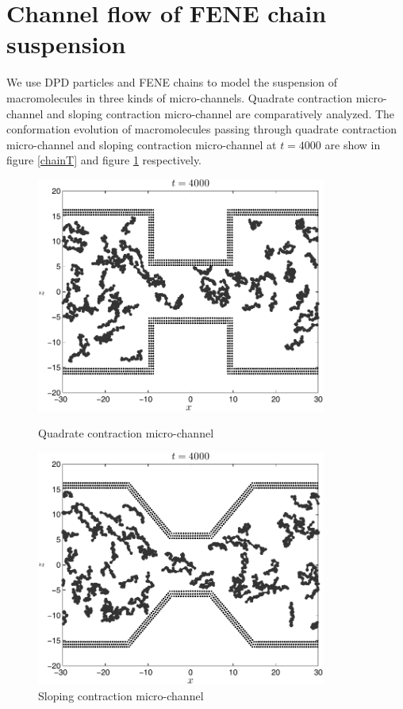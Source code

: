 \documentclass[12pt,a4paper]{article}   %
\begin{document}
\section{Channel flow of FENE chain suspension}

We use DPD particles and FENE chains to model the suspension of macromolecules in three kinds of micro-channels. Quadrate contraction micro-channel and sloping contraction micro-channel are comparatively analyzed. The conformation evolution of macromolecules passing through quadrate contraction micro-channel and sloping contraction micro-channel at $t = 4000$ are show in figure \ref{chainT} and figure \ref{chainY} respectively.

\begin{figure}[!htb]
\centering
\begin{minipage}[c]{0.5\textwidth}
\centering
\includegraphics[width=0.85\textwidth]{./figures/chainT4000s.pdf}
\caption{\label{chainT} Quadrate contraction micro-channel}
\end{minipage}%
\begin{minipage}[c]{0.5\textwidth}
\centering
\includegraphics[width=0.85\textwidth]{./figures/chainY4000s.pdf}
\caption{\label{chainY} Sloping contraction micro-channel}
\end{minipage}
\end{figure}
\end{document}

